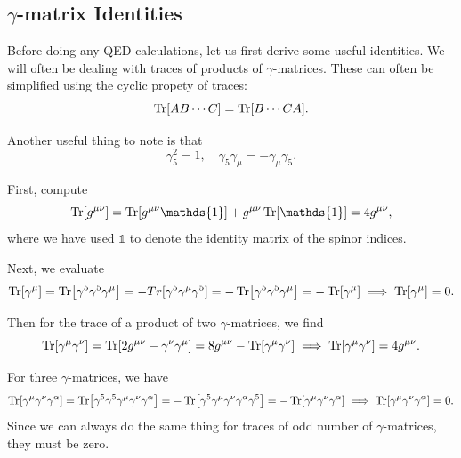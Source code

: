 \documentclass[11pt]{article}
\theoremstyle{definition}
\begin{document}
\subsection{$\gamma$-matrix Identities}
Before doing any QED calculations, let us first derive some useful identities. We will often be dealing with traces of products of $\gamma$-matrices. These can often be simplified using the cyclic propety of traces:
\begin{equation}
    \Tr[AB\cdots C] = \Tr[B \cdots CA].
\end{equation}

Another useful thing to note is that
\begin{equation}
    \gamma_5^2 = 1, \quad \gamma_5\gamma_\mu = -\gamma_\mu\gamma_5.
\end{equation}

First, compute
\begin{equation}
    \Tr[g^{\mu\nu}] = \Tr[g^{\mu\nu}\mathds{1}] + g^{\mu\nu}\Tr[\mathds{1}] = 4g^{\mu\nu},
\end{equation}
where we have used $\mathds{1}$ to denote the identity matrix of the spinor indices.

Next, we evaluate
\begin{equation}
    \Tr[\gamma^\mu] = \Tr[\gamma^5\gamma^5\gamma^\mu] = -Tr[\gamma^5\gamma^\mu\gamma^5]  = -\Tr[\gamma^5\gamma^5\gamma^\mu] = -\Tr[\gamma^\mu] \implies \Tr[\gamma^\mu] = 0.
\end{equation}

Then for the trace of a product of two $\gamma$-matrices, we find
\begin{equation}
    \Tr[\gamma^\mu\gamma^\nu] = \Tr[2g^{\mu\nu}-\gamma^\nu\gamma^\mu] = 8g^{\mu\nu} -\Tr[\gamma^\mu\gamma^\nu] \implies \Tr[\gamma^\mu\gamma^\nu] = 4g^{\mu\nu}.
\end{equation}

For three $\gamma$-matrices, we have
\begin{equation}
    \Tr[\gamma^\mu\gamma^\nu\gamma^\alpha] = \Tr[\gamma^5\gamma^5\gamma^\mu\gamma^\nu\gamma^\alpha] = -\Tr [\gamma^5\gamma^\mu\gamma^\nu\gamma^\alpha\gamma^5] =  -\Tr[\gamma^\mu\gamma^\nu\gamma^\alpha] \implies \Tr[\gamma^\mu\gamma^\nu\gamma^\alpha] = 0.
\end{equation}
Since we can always do the same thing for traces of odd number of $\gamma$-matrices, they must be zero.
\end{document}
